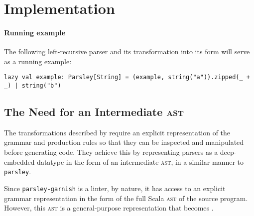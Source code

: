 \documentclass[../../main.tex]{subfiles}
\begin{document}
\label{sec:factor-leftrec}

\section{Implementation}

\paragraph{Running example}
The following left-recursive parser and its transformation into its  form will serve as a running example:
\begin{verbatim}
lazy val example: Parsley[String] = (example, string("a")).zipped(_ + _) | string("b")
\end{verbatim}

\subsection{The Need for an Intermediate \textsc{ast}}
The transformations described by \textcite{baars_leftrec_2004} require an explicit representation of the grammar and production rules so that they can be inspected and manipulated before generating code.
They achieve this by representing parsers as a deep-embedded datatype in the form of an intermediate \textsc{ast}, in a similar manner to \texttt{parsley}.

Since \texttt{parsley-garnish} is a linter, by nature, it has access to an explicit grammar representation in the form of the full Scala \textsc{ast} of the source program.
However, this \textsc{ast} is a general-purpose representation that becomes .
\end{document}
